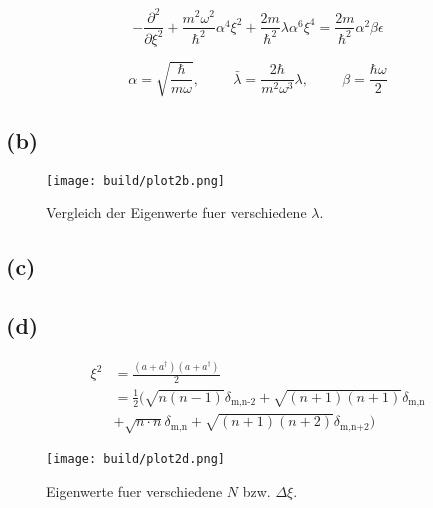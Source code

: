 \documentclass{scrartcl}
\begin{document}
\begin{equation}
		- \frac{\partial^2}{\partial \xi^2} + \frac{m^2
		\omega^2}{\hbar^2} \alpha^4 \xi^2 + \frac{2m}{\hbar^2} \lambda \alpha^6
		\xi^4 = \frac{2m}{\hbar^2} \alpha^2 \beta \epsilon
\end{equation}

\begin{equation}
		\alpha = \sqrt{\frac{\hbar}{m \omega}}, \hspace{1cm} \bar{\lambda} =
		\frac{2 \hbar}{m^2 \omega^3} \lambda, \hspace{1cm} \beta = \frac{\hbar
		\omega}{2}
\end{equation}
\subsection*{(b)}
\begin{figure}[ht]
		\centering
		\texttt{[image: build/plot2b.png]}
		\caption{Vergleich der Eigenwerte fuer verschiedene $\lambda$.}%
		\label{fig:2b}
\end{figure}

\subsection*{(c)}

\subsection*{(d)}
\begin{align}
		\xi^2 &= \frac{(a + a^\dagger)(a + a^\dagger)}{2} \\
			  &= \frac{1}{2} (
		\sqrt{n(n-1)} \delta_\text{m,n-2} + \sqrt{(n+1)(n+1)} \delta_\text{m,n} \\
		&+ \sqrt{n \cdot n} \delta_\text{m,n} +  \sqrt{(n+1)(n+2)}
		\delta_\text{m,n+2} )
\end{align}
\begin{figure}[ht]
		\centering
		\texttt{[image: build/plot2d.png]}
		\caption{Eigenwerte fuer verschiedene $N$ bzw. $\Delta \xi$.}%
		\label{fig:2d}
\end{figure}
\end{document}
